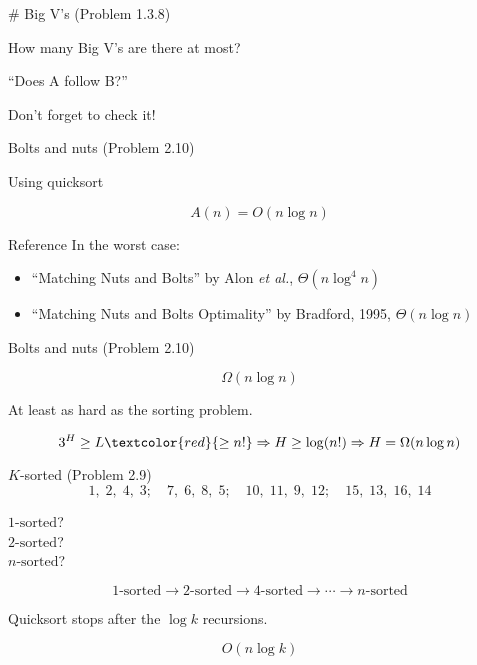 \begin{frame}{\# Big V's (Problem 1.3.8)}
  \centerline{How many Big V's are there at most?}

  \pause
  \vspace{0.50cm}
  \centerline{``Does A follow B?''}

  \pause
  \vspace{0.50cm}
  \centerline{Don't forget to check it!}
\end{frame}
\begin{frame}{Bolts and nuts (Problem 2.10)}

  \pause
  \centerline{Using quicksort}

  \pause
  \[
	A(n) = O(n \log n)
  \]

  \pause
  \begin{alertblock}{Reference}
	In the worst case:
	\begin{itemize}
	  \item ``Matching Nuts and Bolts'' by Alon \emph{et al.}, $\Theta(n \log^4 n)$
	  \pause
	  \item ``Matching Nuts and Bolts Optimality'' by Bradford, 1995, $\Theta(n \log n)$ 
	\end{itemize}
  \end{alertblock}

\end{frame}
\begin{frame}{Bolts and nuts (Problem 2.10)}

  \[
	\Omega(n \log n)
  \]

  \pause
  \centerline{At least as hard as the sorting problem.}

  \pause
  \[
	3^{H} \ge L \textcolor{red}{\ge n!} \Rightarrow H \ge \log (n!) \Rightarrow H = \Omega(n \log n)
  \]
\end{frame}
\begin{frame}{$K$-sorted (Problem 2.9)}
  \[
	1,\;2,\;4,\;3;\quad 7,\;6,\;8,\;5;\quad 10,\;11,\;9,\;12;\quad 15,\;13,\;16,\;14
  \]

  \pause
  \vspace{0.20cm}

  \begin{center}
	$1\text{-sorted}$? \\ \pause
	$2\text{-sorted}$? \\ \pause
	$n\text{-sorted}$?
  \end{center}

  \pause
  \[
	1\text{-sorted} \to 2\text{-sorted} \to 4\text{-sorted} \to \cdots \to n\text{-sorted}
  \]

  \pause
  \centerline{Quicksort stops after the $\log k$ recursions.}

  \pause
  \[
	O(n \log k)
  \]
\end{frame}
